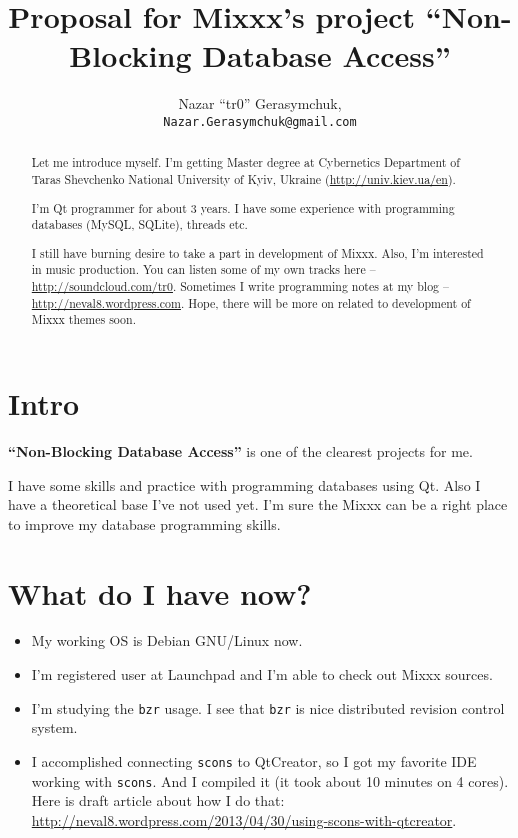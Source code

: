 \documentclass[a4paper,12pt]{scrartcl}
\title{Proposal for Mixxx's project ``Non-Blocking Database Access''}
\author{Nazar ``tr0'' Gerasymchuk, \\ \texttt{\normalsize Nazar.Gerasymchuk@gmail.com}}
\begin{document}
\maketitle
\begin{abstract}
Let me introduce myself. I'm getting Master degree at Cybernetics
Department of Taras Shevchenko National University of Kyiv, Ukraine (\url{http://univ.kiev.ua/en}).

I'm Qt programmer for about 3 years. I have some experience with programming databases (MySQL, SQLite), threads etc.

I still have burning desire to take a part in development of Mixxx. Also, I'm interested in music production. You can listen some of my own tracks here -- \url{http://soundcloud.com/tr0}. Sometimes I write programming notes at my blog -- \url{http://neval8.wordpress.com}. Hope, there will be more on related to development of Mixxx themes soon.
\end{abstract}

\tableofcontents

\section{Intro}

\textbf{``Non-Blocking Database Access''} is one of the clearest projects for me.

I have some skills and practice with programming databases using Qt. Also I have a theoretical base I've not used yet. I'm sure the Mixxx can be a right place to improve my database programming skills.

\section{What do I have now?}
\begin{itemize}
 \item My working OS is Debian GNU/Linux now.
 \item I'm registered user at Launchpad and I'm able to check out Mixxx sources.
 \item I'm studying the \texttt{bzr} usage. I see that \texttt{bzr} is nice distributed revision control system.
 \item I accomplished connecting \texttt{scons} to QtCreator, so I got my favorite IDE working with \texttt{scons}. 
 And I compiled it (it took about 10 minutes on 4 cores). Here is draft article about how I do that: \\ \url{http://neval8.wordpress.com/2013/04/30/using-scons-with-qtcreator}.
\end{itemize}
\end{document}

